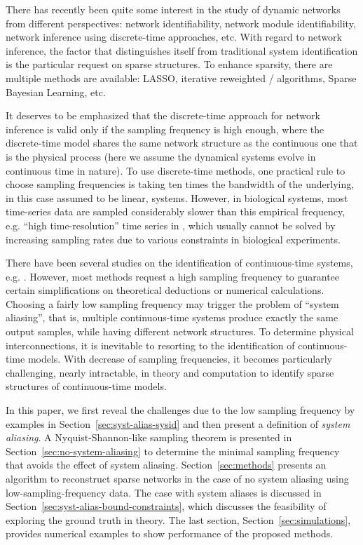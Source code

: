 \documentclass[letterpaper,10pt,journal,final]{IEEEtran}
\theoremstyle{definition}
\theoremstyle{remark}
\begin{document}
There has recently been quite some interest in the study of dynamic networks
from different perspectives: network
identifiability\cite{Goncalves2008,Hayden2016a}, network module
identifiability\cite{VandenHof2013}, network inference using discrete-time
approaches\cite{Chiuso2012,Yue2017a}, etc. With regard to network inference, the
factor that distinguishes itself from traditional system
identification\cite{Ljung1998} is the particular request on sparse
structures. To enhance sparsity, there are multiple methods are available:
LASSO\cite{Yuan2006}, iterative reweighted /
algorithms\cite{Candes2008,Chartrand2008}, Sparse Bayesian
Learning\cite{Tipping2001,Wipf2007}, etc.


It deserves to be emphasized that the discrete-time approach for network
inference is valid only if the sampling frequency is high enough, where the
discrete-time model shares the same network structure as the continuous one that
is the physical process (here we assume the dynamical systems evolve in
continuous time in nature).  To use discrete-time methods, one practical rule to
choose sampling frequencies is taking ten times the bandwidth of the underlying,
in this case assumed to be linear, systems\cite{Ljung1998}.  However, in
biological systems, most time-series data are sampled considerably slower than
this empirical frequency, e.g. ``high time-resolution'' time series in
\cite{He2012}, which usually cannot be solved by increasing sampling rates due to
various constraints in biological experiments.

There have been several studies on the identification of continuous-time
systems, e.g. \cite{Ljung2010,Garnier2003}. However, most methods request a high
sampling frequency to guarantee certain simplifications on theoretical
deductions or numerical calculations. Choosing a fairly low sampling frequency
may trigger the problem of ``system aliasing'', that is, multiple
continuous-time systems produce exactly the same output samples, while having
different network structures. To determine physical interconnections, it is
inevitable to resorting to the identification of continuous-time models.  With decrease of sampling frequencies, it becomes particularly
challenging, nearly intractable, in theory and computation to identify sparse
structures of continuous-time models.

In this paper, we first reveal the challenges due to the low sampling frequency
by examples in Section~\ref{sec:syst-alias-sysid} and then present a definition
of \emph{system aliasing}. A Nyquist-Shannon-like sampling theorem is presented
in Section~\ref{sec:no-system-aliasing} to determine the minimal sampling
frequency that avoids the effect of system aliasing.  Section~\ref{sec:methods}
presents an algorithm to reconstruct sparse networks in the case of no system
aliasing using low-sampling-frequency data. The case with system aliases is
discussed in Section~\ref{sec:syst-alias-bound-constraints}, which discusses the
feasibility of exploring the ground truth in theory. The last section,
Section~\ref{sec:simulations}, provides numerical examples to show performance
of the proposed methods.
\end{document}
